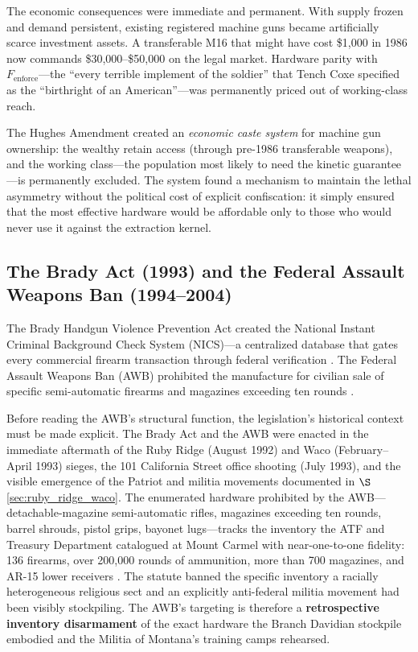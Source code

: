 The economic consequences were immediate and permanent. With supply frozen and demand persistent, existing registered machine guns became artificially scarce investment assets. A transferable M16 that might have cost \$1,000 in 1986 now commands \$30,000--\$50,000 on the legal market. Hardware parity with $F_{\text{enforce}}$---the ``every terrible implement of the soldier'' that Tench Coxe specified as the ``birthright of an American''---was permanently priced out of working-class reach.

The Hughes Amendment created an \textit{economic caste system} for machine gun ownership: the wealthy retain access (through pre-1986 transferable weapons), and the working class---the population most likely to need the kinetic guarantee---is permanently excluded. The system found a mechanism to maintain the lethal asymmetry without the political cost of explicit confiscation: it simply ensured that the most effective hardware would be affordable only to those who would never use it against the extraction kernel.

\subsection{The Brady Act (1993) and the Federal Assault Weapons Ban (1994--2004)}

The Brady Handgun Violence Prevention Act created the National Instant Criminal Background Check System (NICS)---a centralized database that gates every commercial firearm transaction through federal verification \cite{brady1993}. The Federal Assault Weapons Ban (AWB) prohibited the manufacture for civilian sale of specific semi-automatic firearms and magazines exceeding ten rounds \cite{awb1994}.

Before reading the AWB's structural function, the legislation's historical context must be made explicit. The Brady Act and the AWB were enacted in the immediate aftermath of the Ruby Ridge (August 1992) and Waco (February--April 1993) sieges, the 101 California Street office shooting (July 1993), and the visible emergence of the Patriot and militia movements documented in $\S$\ref{sec:ruby_ridge_waco}. The enumerated hardware prohibited by the AWB---detachable-magazine semi-automatic rifles, magazines exceeding ten rounds, barrel shrouds, pistol grips, bayonet lugs---tracks the inventory the ATF and Treasury Department catalogued at Mount Carmel with near-one-to-one fidelity: 136 firearms, over 200{,}000 rounds of ammunition, more than 700 magazines, and AR-15 lower receivers \cite{treasury1993waco}. The statute banned the specific inventory a racially heterogeneous religious sect and an explicitly anti-federal militia movement had been visibly stockpiling. The AWB's targeting is therefore a \textbf{retrospective inventory disarmament} of the exact hardware the Branch Davidian stockpile embodied and the Militia of Montana's training camps rehearsed.

